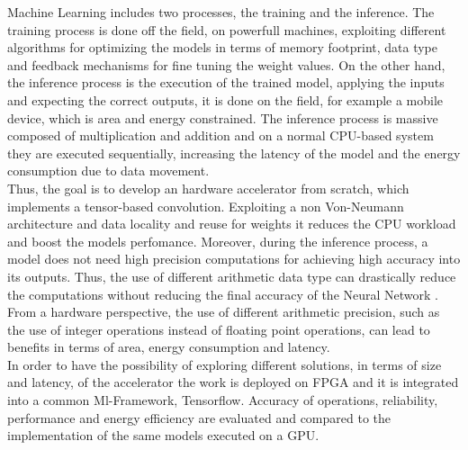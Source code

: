 Machine Learning includes two processes, the training and the inference. The training process is done off the field, on powerfull machines, exploiting different algorithms for optimizing the models in terms of memory footprint, data type and feedback mechanisms for fine tuning the weight values. On the other hand, the inference process is the execution of the trained model, applying the inputs and expecting the correct outputs, it is done on  the field, for example a mobile device, which is area and energy constrained. The inference process is massive composed of multiplication and addition and on a normal CPU-based system they are executed sequentially, increasing the latency of the model and the energy consumption due to data movement.\\
Thus, the goal is to develop an hardware accelerator from scratch, which implements  a tensor-based convolution. Exploiting a non Von-Neumann architecture and data locality and reuse for weights it reduces the CPU workload and boost the models perfomance. Moreover, during the inference process, a model does not need high precision computations \cite{paper:8} \cite{paper:15}for achieving high accuracy into its outputs. Thus, the use of different arithmetic data type can drastically reduce the computations without reducing the final accuracy of the Neural Network \cite{paper:7} \cite{paper:8}. From a hardware perspective,  the use of different arithmetic precision\cite{paper:14}, such as the use of integer operations instead of floating point operations, can lead to benefits in terms of area, energy consumption and latency.\\

In order to have the possibility of exploring different solutions, in terms of size and latency, of the accelerator the work is deployed on FPGA and it is integrated into a common Ml-Framework, Tensorflow. Accuracy of operations, reliability, performance and energy efficiency are evaluated and compared to the implementation of the same models executed on a GPU.
